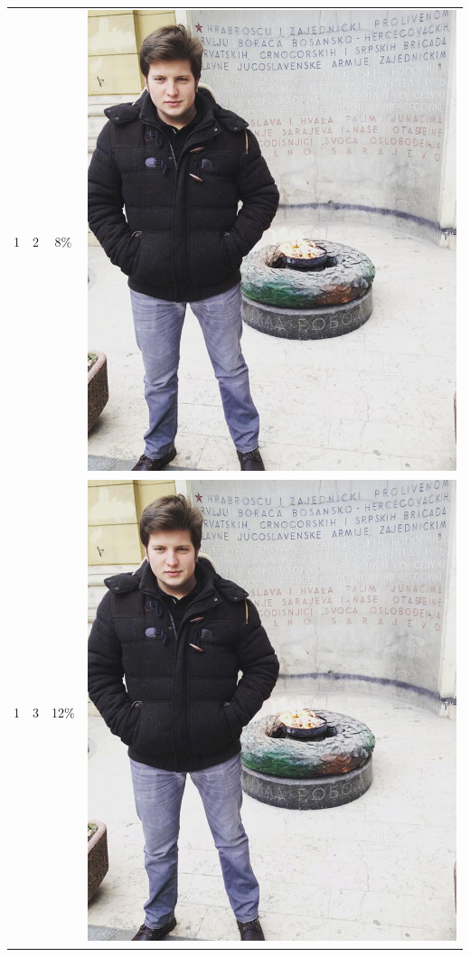 \documentclass[times, utf8, seminar, numeric]{fer}
\begin{document}
\begin{center}
\begin{longtable}{|c|c|c|c|}
1 & 2 &8\% & \includegraphics[scale=0.3]{../benchmark_results/pattern/1_components-2_bits.png} \\
1 & 3 &12\% & \includegraphics[scale=0.3]{../benchmark_results/pattern/1_components-3_bits.png} \\

\end{longtable}
\end{center}
\end{document}

